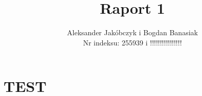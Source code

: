 \documentclass{article}
\title{Raport 1}
\author{Aleksander Jakóbczyk i Bogdan Banasiak\\ 
	Nr indeksu: 255939 i !!!!!!!!!!!!!!!!}
\date{}\date{}
\begin{document}
	
	\maketitle


	\section*{TEST}
	
\end{document}
